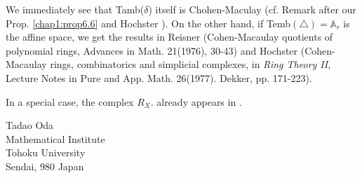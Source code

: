 We immediately see that Tamb($\delta$) itself is Chohen-Maculay 
 (cf. Remark after our Prop. \ref{chap1:prop6.6} and Hochster
\cite{keyH5}). On the other 
hand, if Temb$(\triangle) = \mathbb{A}_r$ is the affine space, we get
the results in Reisner (Cohen-Macaulay quotients of polynomial rings,
Advances in Math. 21(1976), 30-43) and Hochster (Cohen-Macaulay
rings, combinatorics and simplicial complexes, in \textit{Ring Theory
  II}, Lecture Notes in Pure and
App. Math. 26(1977). Dekker, pp. 171-223). 

In a special case, the complex $R_X$. already appears in \cite{keyN3}.

\begin{flushright}
Tadao Oda\\
Mathematical Institute\\
Tohoku University\\
Sendai, 980 Japan
\end{flushright}


